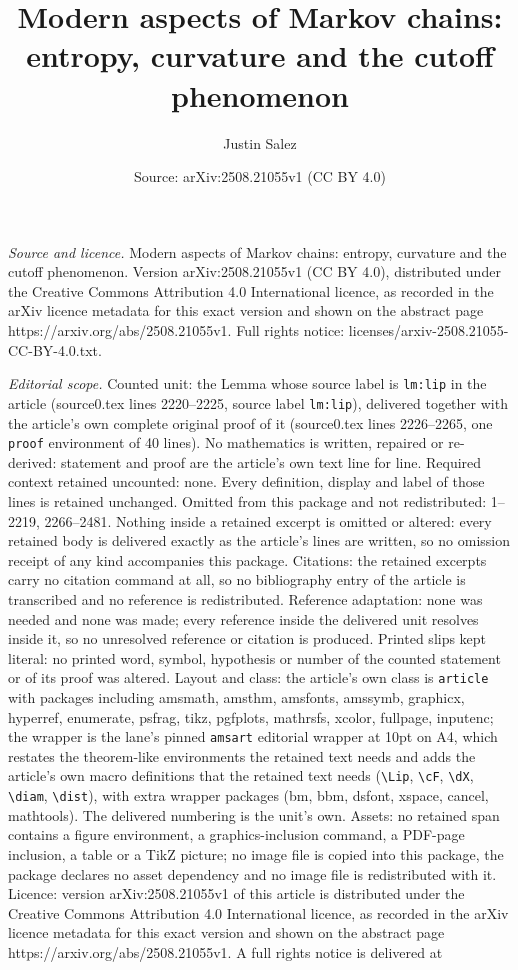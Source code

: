 \documentclass[10pt,a4paper]{amsart}
\title[Modern aspects of Markov chains: entropy, curvature and the ]{Modern aspects of Markov chains: entropy, curvature and the cutoff phenomenon}
\author{Justin Salez}
\date{Source: arXiv:2508.21055v1 (CC BY 4.0)}
\begin{document}
\maketitle

\noindent\emph{Source and licence.} Modern aspects of Markov chains: entropy, curvature and the cutoff phenomenon. Version arXiv:2508.21055v1 (CC BY 4.0), distributed under the Creative Commons Attribution 4.0 International licence, as recorded in the arXiv licence metadata for this exact version and shown on the abstract page https://arxiv.org/abs/2508.21055v1. Full rights notice: licenses/arxiv-2508.21055-CC-BY-4.0.txt.\par\smallskip

\noindent\textit{Editorial scope.} Counted unit: the Lemma whose source label is \texttt{lm:lip} in the article (source0.tex lines 2220--2225, source label \texttt{lm:lip}), delivered together with the article's own complete original proof of it (source0.tex lines 2226--2265, one \texttt{proof} environment of 40 lines). No mathematics is written, repaired or re-derived: statement and proof are the article's own text line for line. Required context retained uncounted: none. Every definition, display and label of those lines is retained unchanged. Omitted from this package and not redistributed: 1--2219, 2266--2481. Nothing inside a retained excerpt is omitted or altered: every retained body is delivered exactly as the article's lines are written, so no omission receipt of any kind accompanies this package. Citations: the retained excerpts carry no citation command at all, so no bibliography entry of the article is transcribed and no reference is redistributed. Reference adaptation: none was needed and none was made; every reference inside the delivered unit resolves inside it, so no unresolved reference or citation is produced. Printed slips kept literal: no printed word, symbol, hypothesis or number of the counted statement or of its proof was altered. Layout and class: the article's own class is \texttt{article} with packages including amsmath, amsthm, amsfonts, amssymb, graphicx, hyperref, enumerate, psfrag, tikz, pgfplots, mathrsfs, xcolor, fullpage, inputenc; the wrapper is the lane's pinned \texttt{amsart} editorial wrapper at 10pt on A4, which restates the theorem-like environments the retained text needs and adds the article's own macro definitions that the retained text needs (\texttt{\textbackslash Lip}, \texttt{\textbackslash cF}, \texttt{\textbackslash dX}, \texttt{\textbackslash diam}, \texttt{\textbackslash dist}), with extra wrapper packages (bm, bbm, dsfont, xspace, cancel, mathtools). The delivered numbering is the unit's own. Assets: no retained span contains a figure environment, a graphics-inclusion command, a PDF-page inclusion, a table or a TikZ picture; no image file is copied into this package, the package declares no asset dependency and no image file is redistributed with it. Licence: version arXiv:2508.21055v1 of this article is distributed under the Creative Commons Attribution 4.0 International licence, as recorded in the arXiv licence metadata for this exact version and shown on the abstract page https://arxiv.org/abs/2508.21055v1. A full rights notice is delivered at 
\end{document}
